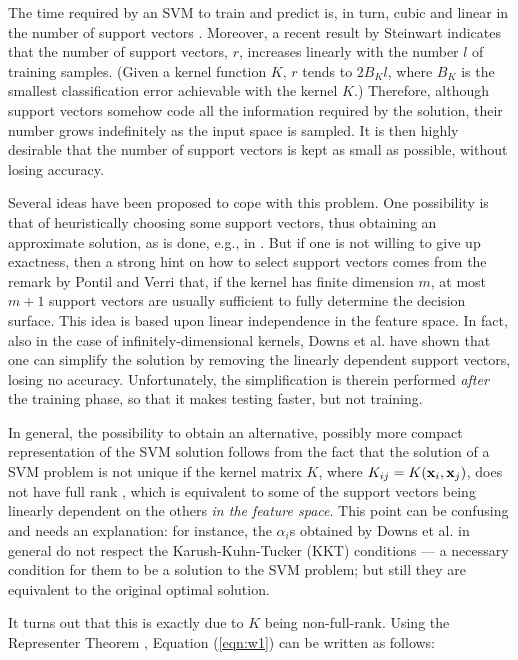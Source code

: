 The time required by an SVM to train and predict is, in turn, cubic
and linear in the number of support vectors
\cite{KeerthiCDC06}. Moreover, a recent result by Steinwart
\cite{Steinwart03} indicates that the number of support vectors, $r$,
increases linearly with the number $l$ of training samples. (Given a
kernel function $K$, $r$ tends to $2 B_K l$, where $B_K$ is the
smallest classification error achievable with the kernel $K$.)
Therefore, although support vectors somehow code all the information
required by the solution, their number grows indefinitely as the input
space is sampled. It is then highly desirable that the number of
support vectors is kept as small as possible, without losing accuracy.

Several ideas have been proposed to cope with this problem. One
possibility is that of heuristically choosing some support vectors,
thus obtaining an approximate solution, as is done, e.g., in
\cite{KeerthiCDC06,LeeM01,schoel06}. But if one is not willing to give
up exactness, then a strong hint on how to select support vectors
comes from the remark by Pontil and Verri \cite{PontilV98} that, if
the kernel has finite dimension $m$, at most $m + 1$ support vectors
are usually sufficient to fully determine the decision surface. This
idea is based upon linear independence in the feature space. In fact,
also in the case of infinitely-dimensional kernels, Downs et
al. \cite{DownsGM01} have shown that one can simplify the solution by
removing the linearly dependent support vectors, losing no
accuracy. Unfortunately, the simplification is therein performed
\emph{after} the training phase, so that it makes testing faster, but
not training.

In general, the possibility to obtain an alternative, possibly more
compact representation of the SVM solution follows from the fact that
the solution of a SVM problem is not unique if the
kernel matrix $K$, where $K_{ij} = K(\mathbf{x}_i,\mathbf{x}_j)$, does not have full
rank \cite{Burges98}, which is equivalent to some of the support vectors being
linearly dependent on the others \emph{in the feature space}. This
point can be confusing and needs an explanation: for instance, the
$\alpha_i$s obtained by Downs et al. in general do not respect the
Karush-Kuhn-Tucker (KKT) conditions --- a necessary condition for them
to be a solution to the SVM problem; but still they are equivalent to
the original optimal solution.

It turns out that this is exactly due to $K$ being
non-full-rank. Using the Representer Theorem
\cite{CoxOS90,KimeldorfW70}, Equation (\ref{eqn:w1}) can be written as
follows:

